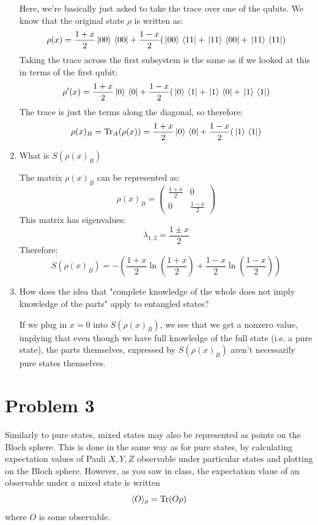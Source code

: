 \documentclass[10pt]{article}
\begin{document}
\begin{enumerate}[label=\alph*)]
			\begin{solution}
				Here, we're basically just asked to take the trace over one of the qubits. We know that the 
				original state \( \rho \) is written as:
				\[
				\rho(x) = \frac{1 + x}{2}\ket*{00}\bra*{00} + \frac{1-x}{2}(\ket*{00}\bra*{11} + \ket*{11}\bra*{00}
				+ \ket*{11}\bra*{11})
				\] 
				Taking the trace across the first subsystem is the same as if we looked at this in terms 
				of the first qubit:
				\[
				\rho'(x) = \frac{1 + x}{2}\ket*{0}\bra*{0} + \frac{1 -x}{2}(\ket*{0}\bra*{1}+
				\ket*{1}\bra*{0}+ \ket*{1}\bra*{1})
				\] 
				The trace is just the terms along the diagonal, so therefore:
				\[
				\rho(x)_B = \Tr_A(\rho(x)) = \frac{1 + x}{2}\ket*{0}\bra*{0} + \frac{1 - x}{2}(\ket*{1}\bra*{1})
				\] 
			\end{solution}
		\item What is \( S(\rho(x)_B) \) 

			\begin{solution}
				The matrix \( \rho(x)_B \) can be represented as:
				\[
					\rho(x)_B = \begin{pmatrix} \frac{1 + x}{2} & 0\\0 & \frac{1 - x}{2} \end{pmatrix} 
				\] 
				This matrix has eigenvalues:
				\[
				\lambda_{1, 2} = \frac{1 \pm x}{2}
				\] 
				Therefore:
				\[
				S(\rho(x)_B) = -\left(\frac{1 + x}{2}\ln\left( \frac{1 + x}{2} \right) 
				+ \frac{1 - x}{2}\ln\left( \frac{1 - x}{2} \right) \right)
				\] 
			\end{solution}
		\item How does the idea that "complete knowledge of the whole does not imply knowledge of the parts" apply 
			to entangled states?

			\begin{solution}
				If we plug in \( x = 0 \) into \( S(\rho(x)_B) \), we see that we get a nonzero value, implying that 
				even though we have full knowledge of the full state (i.e. a pure state), the parts themselves, 
				expressed by \( S(\rho(x)_B) \) aren't necessarily pure states themselves.
			\end{solution}
	 \end{enumerate}
	 \pagebreak
	 \section*{Problem 3}
	 Similarly to pure states, mixed states may also be represented as points on the Bloch sphere. This is done in the 
	 same way as for pure states, by calculating expectation values of Pauli \( X, Y, Z \) observable under 
	 particular states and plotting on the Bloch sphere. However, as you saw in class, the expectation vlaue 
	 of an observable under a mixed state is written 
	 \[
		 \langle O \rangle_\rho = \Tr(O\rho)
	 \] 
	 where \( O \) is some observable. 
\end{document}
